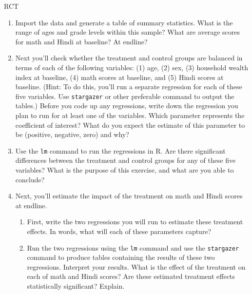 \begin{homeworkProblem}{RCT}
    \begin{enumerate}
        \item Import the data and generate a table of summary statistics. What 
            is the range of ages and grade levels within this sample? What are 
            average scores for math and Hindi at baseline? At endline?

        \item Next you’ll check whether the treatment and control groups are 
            balanced in terms of each of the following variables: (1) age, (2) 
            sex, (3) household wealth index at baseline, (4) math scores at 
            baseline, and (5) Hindi scores at baseline. (Hint: To do this, 
            you’ll run a separate regression for each of these five variables. 
            Use \texttt{stargazer} or other preferable command to output the 
            tables.) Before you code up any regressions, write down the 
            regression you plan to run for at least one of the variables. 
            Which parameter represents the coefficient of interest? What do 
            you expect the estimate of this parameter to be (positive, 
            negative, zero) and why?

        \item Use the \texttt{lm} command to run the regressions in R. Are 
            there significant differences between the treatment and control 
            groups for any of these five variables? What is the purpose of 
            this exercise, and what are you able to conclude?

        \item Next, you’ll estimate the impact of the treatment on math and 
            Hindi scores at endline.

        \begin{enumerate}
            \item First, write the two regressions you will run to estimate 
                these treatment effects. In words, what will each of these 
                parameters capture?
            \item Run the two regressions using the \texttt{lm} command and 
                use the \texttt{stargazer} command to produce tables containing 
                the results of these two regressions. Interpret your results. 
                What is the effect of the treatment on each of math and Hindi 
                scores? Are these estimated treatment effects statistically 
                significant? Explain.
        \end{enumerate}
        
    \end{enumerate}

\end{homeworkProblem}